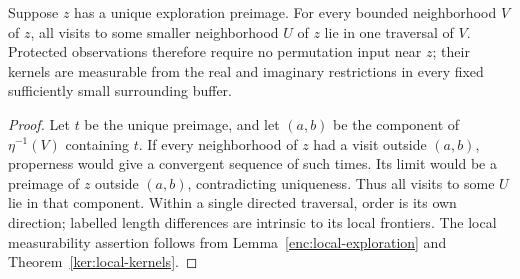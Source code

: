 \begin{lemma}\label{ker:single-traversal}
Suppose \(z\) has a unique exploration preimage.  For every bounded
neighborhood \(V\) of \(z\), all visits to some smaller neighborhood
\(U\) of \(z\) lie in one traversal of \(V\).  Protected observations
therefore require no permutation input near \(z\); their kernels
are measurable from the real and imaginary restrictions in every
fixed sufficiently small surrounding buffer.
\end{lemma}

\begin{proof}
Let \(t\) be the unique preimage, and let \((a,b)\) be the component
of \(\eta^{-1}(V)\) containing \(t\).  If every neighborhood of \(z\)
had a visit outside \((a,b)\), properness would give a convergent
sequence of such times.  Its limit would be a preimage of \(z\)
outside \((a,b)\), contradicting uniqueness.  Thus all visits to
some \(U\) lie in that component.  Within a single directed traversal,
order is its own direction; labelled length differences are intrinsic
to its local frontiers.  The local measurability assertion follows
from Lemma~\ref{enc:local-exploration} and
Theorem~\ref{ker:local-kernels}.
\end{proof}

